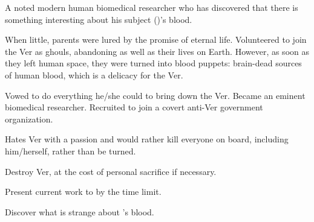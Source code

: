 \documentclass[char]{guildcamp4}
\begin{document}
\name{\cSpite{}}

\begin{itemz}[Backstory]
    \item A noted modern human biomedical researcher who has discovered that there is something interesting about his subject (\cPlead{})'s blood.
    \item When little, parents were lured by the promise of eternal life. Volunteered to join the Ver as ghouls, abandoning \cSpite{} as well as their lives on Earth. However, as soon as they left human space, they were turned into blood puppets: brain-dead sources of human blood, which is a delicacy for the Ver.
    \item Vowed to do everything he/she could to bring down the Ver. Became an eminent biomedical researcher. Recruited to join a covert anti-Ver government organization.
    \item Hates Ver with a passion and would rather kill everyone on board, including him/herself, rather than be turned.
\end{itemz}

\begin{itemz}[Goals]
	\item Destroy Ver, at the cost of personal sacrifice if necessary.
	\item Present current work to \cVone{} by the time limit.
	\item Discover what is strange about \cPlead{}'s blood.
\end{itemz}

\begin{itemz}[Notes]
	\item 
\end{itemz}

\begin{contacts}
	\contact{\cTest{}}
\end{contacts}
\end{document}
